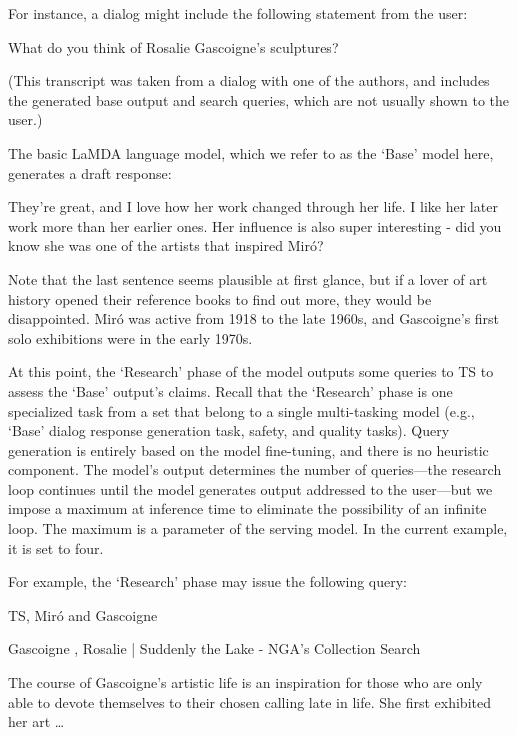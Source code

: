 For instance, a dialog might include the following statement from the user:

\begin{dialogue}
 What do you think of Rosalie Gascoigne's sculptures?
\end{dialogue}

(This transcript was taken from a dialog with one of the authors, and includes the generated base output and search queries, which are not usually shown to the user.)

The basic LaMDA language model, which we refer to as the `Base' model here, generates a draft response:

\begin{dialogue}
 They're great, and I love how her work changed through her life. I like her later work more than her earlier ones. Her influence is also super interesting - did you know she was one of the artists that inspired Mir\'o?
\end{dialogue}

Note that the last sentence seems plausible at first glance, but if a lover of art history opened their reference books to find out more, they would be disappointed. Mir\'o was active from 1918 to the late 1960s, and Gascoigne's first solo exhibitions were in the early 1970s. 

At this point, the `Research' phase of the model outputs some queries to TS to assess the `Base' output's claims. Recall that the `Research' phase is one specialized task from a set that belong to a single multi-tasking model (e.g., `Base' dialog response generation task, safety, and quality tasks). Query generation is entirely based on the model fine-tuning, and there is no heuristic component. The model's output determines the number of queries---the research loop continues until the model generates output addressed to the user---but we impose a maximum at inference time to eliminate the possibility of an infinite loop. The maximum is a parameter of the serving model. In the current example, it is set to four.

For example, the `Research' phase may issue the following query:

\begin{dialogue}

 TS, Mir\'o and Gascoigne

 Gascoigne , Rosalie | Suddenly the Lake - NGA's Collection Search \par The course of Gascoigne's artistic life is an inspiration for those who are only able to devote themselves to their chosen calling late in life. She first exhibited her art \dots \par  \texttt{}
\end{dialogue}

